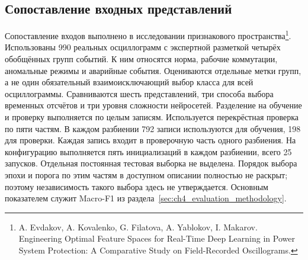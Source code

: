{}

{}

\subsection{Сопоставление входных представлений}
\label{sec:ch4_feature_comparison}

{}

Сопоставление входов выполнено в исследовании
признакового пространства\footnote{A. Evdakov, A. Kovalenko,
G. Filatova, A. Yablokov, I. Makarov. Engineering Optimal Feature
Spaces for Real-Time Deep Learning in Power System Protection:
A Comparative Study on Field-Recorded Oscillograms.}.
Использованы 990 реальных осциллограмм с экспертной разметкой
четырёх обобщённых групп событий. К ним относятся норма,
рабочие коммутации, аномальные режимы и аварийные события.
Оцениваются отдельные метки групп, а не один обязательный
взаимоисключающий выбор класса для всей осциллограммы.
Сравниваются шесть представлений, три способа выбора временных
отсчётов и три уровня сложности нейросетей.
Разделение на обучение и проверку выполняется по целым записям.
Используется перекрёстная проверка по пяти частям.
В каждом разбиении 792 записи используются для обучения,
198 для проверки. Каждая запись входит в проверочную часть
одного разбиения. На конфигурацию выполняется пять
инициализаций в каждом разбиении, всего 25 запусков.
Отдельная постоянная тестовая выборка не выделена.
Порядок выбора эпохи и порога по этим частям
в доступном описании полностью не раскрыт;
поэтому независимость такого выбора здесь не утверждается.
Основным показателем служит Macro-F1 из раздела~\ref{sec:ch4_evaluation_methodology}.

